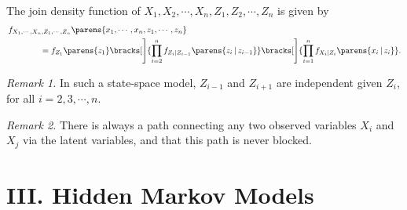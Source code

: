 \documentclass[12pt]{article}
\begin{document}
\begin{enumerate}[label=\textbf{\arabic*.}]
	The join density function of $X_1, X_2, \cdots, X_n, Z_1, Z_2, \cdots, Z_n$ is given by 
	\begin{align*}
		& \, f_{X_1, \cdots, X_n, Z_1, \cdots, Z_n} \parens{x_1, \cdots, x_n, z_1, \cdots, z_n} \\ 
		& \qquad \qquad = f_{Z_1} \parens{z_1} \bracks[\Bigg]{\prod_{i=2}^n f_{Z_i \vert Z_{i-1}} \parens{z_i \,\vert\, z_{i-1}}} \bracks[\Bigg]{\prod_{i=1}^n f_{X_i \vert Z_i} \parens{x_i \,\vert\, z_{i}}}.  
	\end{align*}
	
	\textit{Remark 1.} In such a state-space model, $Z_{i-1}$ and $Z_{i+1}$ are independent given $Z_i$, for all $i = 2, 3, \cdots, n$. 
	
	\textit{Remark 2.} There is always a path connecting any two observed variables $X_i$ and $X_j$ via the latent variables, and that this path is never blocked. 
	
\end{enumerate}


\section*{III. Hidden Markov Models}
\end{document}
